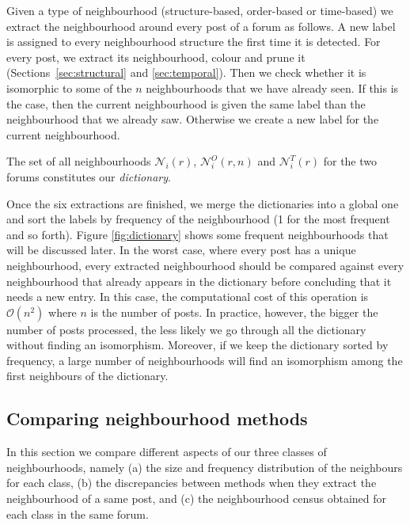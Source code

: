 \documentclass[conference]{IEEEtran}
\begin{document}
Given a type of neighbourhood (structure-based, order-based or time-based) we extract the neighbourhood around every post of a forum as follows. A new label is assigned to every neighbourhood structure the first time it is detected. For every post, we extract its neighbourhood, colour and prune it (Sections~\ref{sec:structural} and \ref{sec:temporal}). Then we check whether it is isomorphic to some of the $n$ neighbourhoods that we have already seen. If this is the case, then the current neighbourhood is given the same label than the neighbourhood that we already saw. Otherwise we create a new label for the current neighbourhood. 



The set of all neighbourhoods $\mathcal{N}_i(r)$, $\mathcal{N}_i^O(r,n)$ and  $\mathcal{N}_i^T(r)$ for the two forums constitutes our \textit{dictionary}.

Once the six extractions are finished, we merge the dictionaries into a global one and sort the labels by frequency of the neighbourhood (1 for the most frequent and so forth). Figure \ref{fig:dictionary} shows some frequent neighbourhoods that will be discussed later.
In the worst case, where every post has a unique neighbourhood, every extracted neighbourhood should be compared against every neighbourhood that already appears in the dictionary before concluding that it needs a new entry. In this case, the computational cost of this operation is $\mathcal{O}(n^2)$ where $n$ is the number of posts. In practice, however, the bigger the number of posts processed, the less likely we go through all the dictionary without finding an isomorphism. Moreover, if we keep the dictionary sorted by frequency, a large number of neighbourhoods will find an isomorphism among the first neighbours of the dictionary. 

\subsection{Comparing neighbourhood methods}
In this section we compare different aspects of our three classes of neighbourhoods, namely (a) the size and frequency distribution of the neighbours for each class, (b) the discrepancies between methods when they extract the neighbourhood of a same post, and (c) the neighbourhood census obtained for each class in the same forum. 
\end{document}
